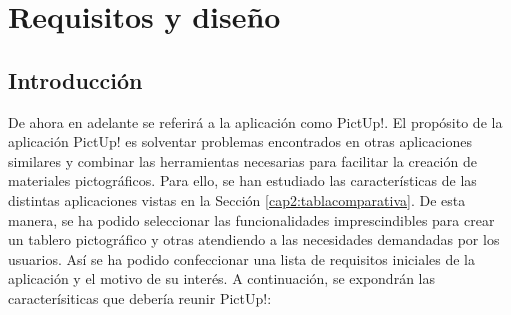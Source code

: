 \chapter{Requisitos y diseño}
\label{cap:introduccion}



	

\label{cap1:sec:Motivacion}


\section{Introducción}
De ahora en adelante se referirá a la aplicación como PictUp!. El propósito de la aplicación PictUp! es solventar problemas encontrados en otras aplicaciones similares y combinar las herramientas necesarias para facilitar la creación de materiales pictográficos. Para ello, se han estudiado las características de las distintas aplicaciones vistas en la Sección \ref{cap2:tablacomparativa}. De esta manera, se ha podido seleccionar las funcionalidades imprescindibles para crear un tablero pictográfico y otras atendiendo a las necesidades demandadas por los usuarios. Así se ha podido confeccionar una lista de requisitos iniciales de la aplicación y el motivo de su interés. A continuación, se expondrán las caracterísiticas que debería reunir PictUp!: 


